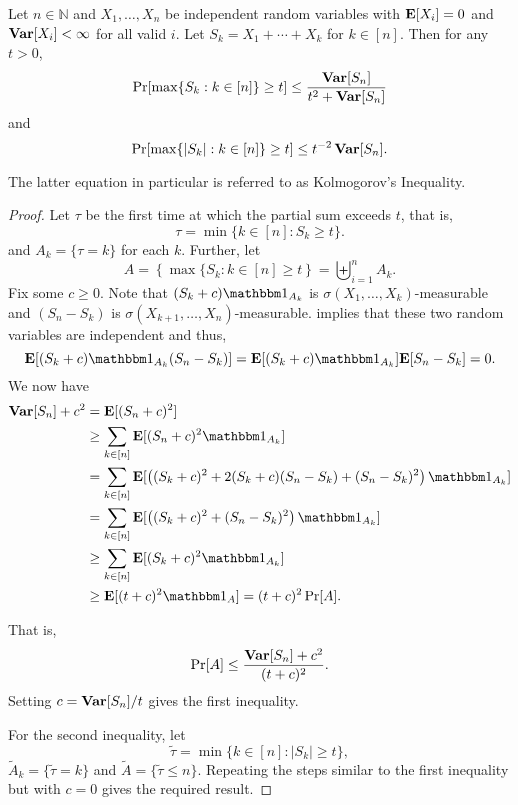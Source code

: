 \begin{ftheo}
\label{kolmogorov's inequality}
    Let $n\in\mathbb{N}$ and $X_1,\ldots,X_n$ be independent random variables with $\textbf{E}[X_i]=0$ and $\operatorname{\textbf{Var}}[X_i]<\infty$ for all valid $i$. Let $S_k=X_1+\cdots+X_k$ for $k\in[n]$. Then for any $t>0$,
    $$\Pr[\max\{S_k:k\in[n]\}\geq t] \leq \frac{\operatorname{\textbf{Var}}[S_n]}{t^2+\operatorname{\textbf{Var}}[S_n]}$$
    and
    $$\Pr[\max\{|S_k|:k\in[n]\}\geq t] \leq t^{-2}\operatorname{\textbf{Var}}[S_n].$$
\end{ftheo}
The latter equation in particular is referred to as Kolmogorov's Inequality.
\begin{proof}
    Let $\tau$ be the first time at which the partial sum exceeds $t$, that is,
    $$\tau = \min\{k\in[n]:S_k\geq t\}.$$
    and $A_k=\{\tau=k\}$ for each $k$. Further, let
    $$A=\left\{\max\{S_k:k\in[n]\geq t\right\}=\biguplus_{i=1}^n A_k.$$
    Fix some $c\geq 0$. Note that $(S_k+c)\indic_{A_k}$ is $\sigma(X_1,\ldots,X_k)$-measurable and $(S_n-S_k)$ is $\sigma(X_{k+1},\ldots,X_n)$-measurable.  implies that these two random variables are independent and thus,
    $$\expec[(S_k+c)\indic_{A_k}(S_n-S_k)]=\expec[(S_k+c)\indic_{A_k}]\expec[S_n-S_k]=0.$$
    We now have
    \begin{align*}
        \Var[S_n] + c^2 &= \expec[(S_n+c)^2] \\
        &\geq \sum_{k\in[n]}\expec[(S_n+c)^2\indic_{A_k}] \\
        &= \sum_{k\in[n]}\expec[\left((S_k+c)^2 + 2(S_k+c)(S_n-S_k)+(S_n-S_k)^2\right)\indic_{A_k}] \\
        &= \sum_{k\in[n]} \expec[\left((S_k+c)^2+(S_n-S_k)^2\right)\indic_{A_k}] \\
        &\geq \sum_{k\in[n]} \expec[(S_k+c)^2\indic_{A_k}] \\
        &\geq \expec[(t+c)^2\indic_{A}] = (t+c)^2\Pr[A].
    \end{align*}
    
    That is,
    $$\Pr[A]\leq \frac{\operatorname{\textbf{Var}}[S_n]+c^2}{(t+c)^2}.$$
    Setting $c=\operatorname{\textbf{Var}}[S_n]/t$ gives the first inequality.
    
    \vspace{2mm}
    For the second inequality, let
    $$\tilde{\tau}=\min\{k\in[n]:|S_k|\geq t\},$$
    $\tilde{A}_k=\{\tilde{\tau}=k\}$ and $\tilde{A}=\{\tilde{\tau}\leq n\}$. Repeating the steps similar to the first inequality but with $c=0$ gives the required result.
\end{proof}

